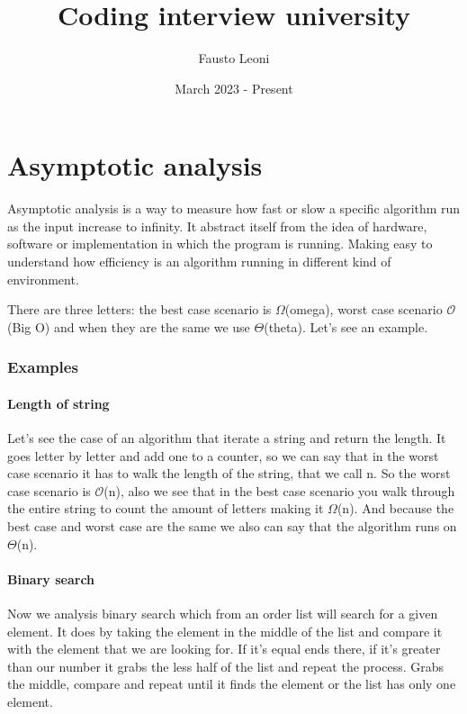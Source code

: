 \documentclass{report}
\title{\Huge{Coding interview university}}
\author{\huge{Fausto Leoni}}
\date{March 2023 - Present}
\begin{document}
\maketitle
\newpage%
\tableofcontents
\pagebreak

\chapter{Asymptotic analysis}

Asymptotic analysis is a way to measure how fast or slow a specific algorithm run as the input increase to infinity. It abstract itself from the idea of hardware, software or implementation in which the program is running. Making easy to understand how efficiency is an algorithm running in different kind of environment. 

There are three letters: the best case scenario is $\Omega$(omega), worst case scenario $\mathcal{O}$(Big O) and when they are the same we use $\Theta$(theta). Let's see an example.

\subsection*{Examples}
\subsubsection{Length of string}
Let's see the case of an algorithm that iterate a string and return the length. It goes letter by letter and add one to a counter, so we can say that in the worst case scenario it has to walk the length of the string, that we call n. So the worst case scenario is $\mathcal{O}$(n), also we see that in the best case scenario you walk through the entire string to count the amount of letters making it $\Omega$(n). And because the best case and worst case are the same we also can say that the algorithm runs on $\Theta$(n).

\subsubsection{Binary search}
Now we analysis binary search which from an order list will search for a given element. It does by taking the element in the middle of the list and compare it with the element that we are looking for. If it's equal ends there, if it's greater than our number it grabs the less half of the list and repeat the process. Grabs the middle, compare and repeat until it finds the element or the list has only one element.
\end{document}
